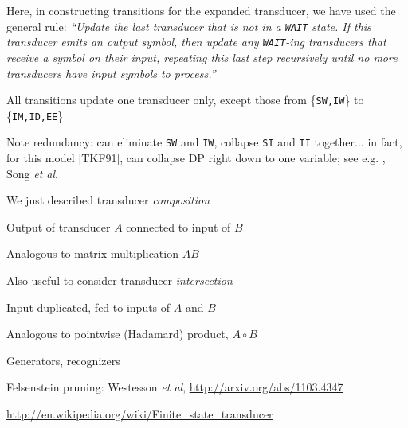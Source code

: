 \documentclass{beamer}
\begin{document}
\begin{frame}{}
 Here, in constructing transitions for the expanded transducer, we have used the general rule:
{\em``Update the last transducer that is not in a {\tt WAIT} state. If this transducer emits an output symbol,
 then update any {\tt WAIT}-ing transducers that receive a symbol on their input,
 repeating this last step recursively until no more transducers have input symbols to process.''}

All transitions update one transducer only, except those from \{{\tt SW,IW}\} to \{{\tt IM,ID,EE}\}

Note redundancy: can eliminate {\tt SW} and {\tt IW}, collapse {\tt SI} and {\tt II} together...
in fact, for this model [TKF91], can collapse DP right down to one variable; see e.g. \Miklos, Song {\em et al}.
\end{frame}

\begin{frame}{}
\itemb
\item We just described transducer {\em composition}
 \itemb
 \item Output of transducer $A$ connected to input of $B$
 \item Analogous to matrix multiplication $AB$
 \iteme
\item Also useful to consider transducer {\em intersection}
 \itemb
 \item Input duplicated, fed to inputs of $A$ and $B$
 \item Analogous to pointwise (Hadamard) product, $A \circ B$
 \iteme
\item Generators, recognizers
\item Felsenstein pruning: Westesson {\em et al}, \url{http://arxiv.org/abs/1103.4347}
\iteme
\small
\centerline{ \url{http://en.wikipedia.org/wiki/Finite_state_transducer} }
\normalsize
\end{frame}
\end{document}
